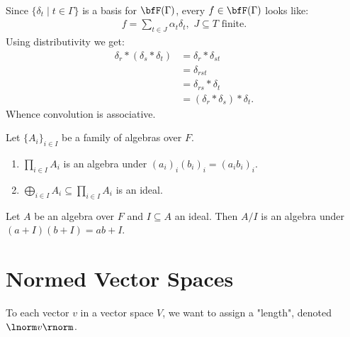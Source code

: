 \begin{example}
\begin{equation*}
\begin{split}
            \end{split}
            \end{equation*}
        Since $\{\delta_t \mid t \in \Gamma\}$ is a basis for $\bfF(\Gamma)$, every $f \in \bfF(\Gamma)$ looks like:
            \begin{equation*}
            \begin{split}
                f = \sum_{t \in J}\alpha_t \delta_t , \hspace{4pt}J \subseteq T \hspace{4pt}\text{finite}.
            \end{split}
            \end{equation*}
        Using distributivity we get:
            \begin{equation*}
            \begin{split}
                \delta_r \ast (\delta_s \ast \delta_t)
                & = \delta_r \ast \delta_{st} \\
                & = \delta_{rst} \\
                & = \delta_{rs} \ast \delta_t \\
                & = (\delta_r \ast \delta_s) \ast \delta_t.
            \end{split}
            \end{equation*}
        Whence convolution is associative.
    \end{example}

    \begin{exercise}
        Let $\{A_i\}_{i \in I}$ be a family of algebras over $F$.
        \begin{enumerate}[label = (\arabic*),itemsep=1pt,topsep=3pt]
            \item $\prod_{i \in I}A_i$ is an algebra under $(a_i)_i(b_i)_i = (a_ib_i)_i$.
            \item $\bigoplus_{i \in I}A_i \subseteq \prod_{i \in I}A_i$ is an ideal.
        \end{enumerate}
    \end{exercise}
    \begin{exercise}
        Let $A$ be an algebra over $F$ and $I \subseteq A$ an ideal. Then $A/I$ is an algebra under $(a+I)(b+I) = ab+I$.
    \end{exercise}

\section{Normed Vector Spaces}
    To each vector $v$ in a vector space $V$, we want to assign a "length", denoted $\lnorm v \rnorm$.

